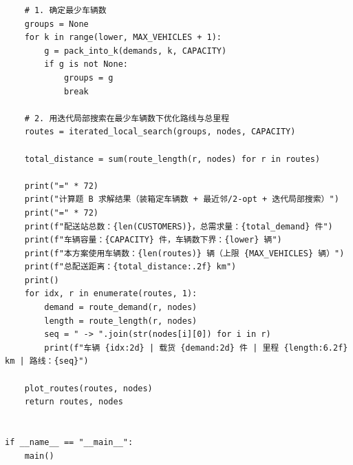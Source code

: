 \documentclass[12pt,a4paper]{ctexart}
\begin{document}
\begin{lstlisting}
    # 1. 确定最少车辆数
    groups = None
    for k in range(lower, MAX_VEHICLES + 1):
        g = pack_into_k(demands, k, CAPACITY)
        if g is not None:
            groups = g
            break

    # 2. 用迭代局部搜索在最少车辆数下优化路线与总里程
    routes = iterated_local_search(groups, nodes, CAPACITY)

    total_distance = sum(route_length(r, nodes) for r in routes)

    print("=" * 72)
    print("计算题 B 求解结果（装箱定车辆数 + 最近邻/2-opt + 迭代局部搜索）")
    print("=" * 72)
    print(f"配送站总数：{len(CUSTOMERS)}，总需求量：{total_demand} 件")
    print(f"车辆容量：{CAPACITY} 件，车辆数下界：{lower} 辆")
    print(f"本方案使用车辆数：{len(routes)} 辆（上限 {MAX_VEHICLES} 辆）")
    print(f"总配送距离：{total_distance:.2f} km")
    print()
    for idx, r in enumerate(routes, 1):
        demand = route_demand(r, nodes)
        length = route_length(r, nodes)
        seq = " -> ".join(str(nodes[i][0]) for i in r)
        print(f"车辆 {idx:2d} | 载货 {demand:2d} 件 | 里程 {length:6.2f} km | 路线：{seq}")

    plot_routes(routes, nodes)
    return routes, nodes


if __name__ == "__main__":
    main()
\end{lstlisting}
\end{document}
